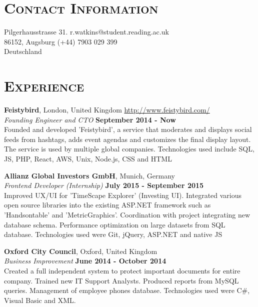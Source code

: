\documentclass[line, margin, 10pt]{res}
\begin{document}
\renewcommand{\namefont}{ \LARGE \bf }


\begin{resume}

\section{\textsc{Contact Information}}
Pilgerhausstrasse 31.  \hfill{r.watkins@student.reading.ac.uk}\\
86152, Augsburg \hfill{(+44) 7903 029 399}\\
Deutschland 

\section{\textsc{Experience}}


{\bf Feistybird}, London, United Kingdom \hfill{\url{http://www.feistybird.com/}} \\
\textit{Founding Engineer and CTO} \hfill {\bf September 2014 - Now}\\
Founded and developed 'Feistybird', a service that moderates and displays social feeds from hashtags, adds event agendas and customizes the final display layout. The service is used by multiple global companies.
Technologies used include SQL, JS, PHP, React, AWS, Unix, Node.js, CSS and HTML

{\bf Allianz Global Investors GmbH}, Munich, Germany\\
{\it Frontend Developer (Internship)} {\bf \hfill July 2015 - September 2015}\\
Improved UX/UI for 'TimeScape Explorer' (Investing UI). Integrated various open source libraries into the existing ASP.NET framework such as 'Handsontable' and 'MetricGraphics'.
 Coordination with project integrating new database schema. Performance optimization on large datasets from SQL database. Technologies used were Git, jQuery, ASP.NET and native JS

{\bf Oxford City Council}, Oxford, United Kingdom\\
{\it Business Improvement} {\bf \hfill June 2014 - October 2014}\\
Created a full independent system to protect important documents for entire company.  Trained new IT Support Analysts. Produced reports from MySQL queries. Management of employee phones database. Technologies used were C\#, Visual Basic and XML.


\end{resume}
\end{document}
